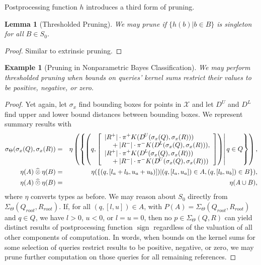 \documentclass{article}
\newtheorem{lemma}{Lemma}
\newtheorem{example} {Example}
\newcommand{\GNP}[1][\psi]{{#1}_{\Theta}}
\newcommand{\otimeshat}{\mathbin{\widehat{\otimes}}}
\newcommand{\odothat}{\mathbin{\widehat{\odot}}}
\DeclareMathOperator{\sign}{sign}
\begin{document}

Postprocessing function $h$ introduces a
third form of pruning.
\begin{lemma}[Thresholded Pruning]
  We may prune if $\{h(b) | b \in B\}$ is singleton for all $B \in
  S_0$.
\end{lemma}
\begin{proof}
  Similar to extrinsic pruning.
\end{proof}

\begin{example}[Pruning in Nonparametric Bayes Classification]
  We may perform thresholded pruning when bounds on queries' kernel
  sums restrict their values to be positive, negative, or zero.
\end{example}
\begin{proof}
  Yet again, let $\sigma_x$ find bounding boxes for points in
  $\mathcal{X}$ and let $D^{\!U}$ and $D^{\!L}$ find upper and lower
  bound distances between bounding boxes.  We represent summary
  results with
  \begin{eqnarray*}
    \GNP[\sigma](\sigma_x(Q),\sigma_x(R)) & = & \eta \left( \left\{ \left.\! \left( q, \left[ \begin{array}{ll}
	\lefteqn{|R^+| \cdot \pi^+ K(D^{\!U}(\sigma_x(Q),\sigma_x(R)))} \\
	& \mbox{} + |R^-| \cdot \pi^- K(D^{\!L}(\sigma_x(Q),\sigma_x(R))), \\
	\lefteqn{|R^+| \cdot \pi^+ K(D^{\!L}(\sigma_x(Q),\sigma_x(R)))} \\
	& \mbox{} + |R^-| \cdot \pi^- K(D^{\!U}(\sigma_x(Q),\sigma_x(R)))
    \end{array} \right] \right) \right| q \in Q \right\} \right) , \\
    \eta(A) \otimeshat \eta(B) & = & \eta(\{(q,[l_a + l_b,u_a + u_b)]) | (q,[l_a,u_a]) \in A, (q,[l_b,u_b]) \in B\}), \\
    \eta(A) \odothat \eta(B) & = & \eta(A \cup B),
  \end{eqnarray*}
  where $\eta$ converts types as before.  We may reason about $S_0$
  directly from $\GNP[\Sigma](Q_{root},R_{root})$.  If, for all
  $(q,[l,u]) \in A$, with $P(A) = \GNP[\Sigma](Q_{root},R_{root})$ and
  $q \in Q$, we have $l > 0$, $u < 0$, or $l = u = 0$, then no $p \in
  \GNP[\Sigma](Q,R)$ can yield distinct results of postprocessing
  function $\sign$ regardless of the valuation of all other components
  of computation.  In words, when bounds on the kernel sums for some
  selection of queries restrict results to be positive, negative, or
  zero, we may prune further computation on those queries for all
  remaining references.
\end{proof}
\end{document}
